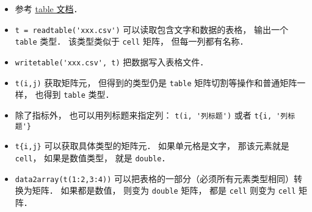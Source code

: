 
\begin{issues}
\issueDraft
\end{issues}

\begin{itemize}
\item 参考 \href{https://www.mathworks.com/help/matlab/tables.html}{table 文档}．
\item \verb|t = readtable('xxx.csv')| 可以读取包含文字和数据的表格， 输出一个 \verb|table| 类型． 该类型类似于 \verb|cell| 矩阵， 但每一列都有名称．
\item \verb|writetable('xxx.csv', t)| 把数据写入表格文件．
\item \verb|t(i,j)| 获取矩阵元， 但得到的类型仍是 \verb|table| 矩阵切割等操作和普通矩阵一样， 也得到 \verb|table| 类型．
\item 除了指标外， 也可以用列标题来指定列： \verb|t(i, '列标题')| 或者 \verb|t{i, '列标题'}|
\item \verb|t{i,j}| 可以获取具体类型的矩阵元． 如果单元格是文字， 那该元素就是 \verb|cell|， 如果是数值类型， 就是 \verb|double|．
\item \verb|data2array(t(1:2,3:4))|  可以把表格的一部分（必须所有元素类型相同）转换为矩阵． 如果都是数值， 则变为 \verb|double| 矩阵， 都是 \verb|cell| 则变为 \verb|cell| 矩阵．
\end{itemize}
